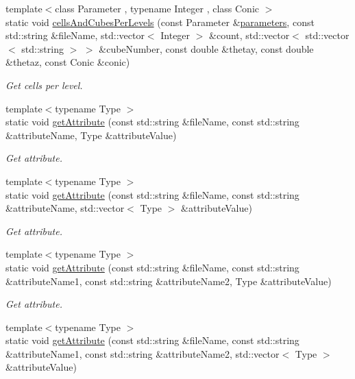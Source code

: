 \begin{DoxyCompactItemize}
{\footnotesize template$<$class Parameter , typename Integer , class Conic $>$ }\\static void \hyperlink{classTReadHDF5_ab142e0d47373804593362c6a92872785}{cells\-And\-Cubes\-Per\-Levels} (const Parameter \&\hyperlink{rays_8h_ae1bc8b0b8c8b9f8e4cc61a5cc7c4ce9e}{parameters}, const std\-::string \&file\-Name, std\-::vector$<$ Integer $>$ \&count, std\-::vector$<$ std\-::vector$<$ std\-::string $>$ $>$ \&cube\-Number, const double \&thetay, const double \&thetaz, const Conic \&conic)
\begin{DoxyCompactList}\small\item\em Get cells per level. \end{DoxyCompactList}\item 
{\footnotesize template$<$typename Type $>$ }\\static void \hyperlink{classTReadHDF5_a4c2d118dacf586206bb9cfa14016d361}{get\-Attribute} (const std\-::string \&file\-Name, const std\-::string \&attribute\-Name, Type \&attribute\-Value)
\begin{DoxyCompactList}\small\item\em Get attribute. \end{DoxyCompactList}\item 
{\footnotesize template$<$typename Type $>$ }\\static void \hyperlink{classTReadHDF5_a1cf2dbad8b9add78d95262d8fc638834}{get\-Attribute} (const std\-::string \&file\-Name, const std\-::string \&attribute\-Name, std\-::vector$<$ Type $>$ \&attribute\-Value)
\begin{DoxyCompactList}\small\item\em Get attribute. \end{DoxyCompactList}\item 
{\footnotesize template$<$typename Type $>$ }\\static void \hyperlink{classTReadHDF5_aca28e0bf060104fb784527da376c6f7b}{get\-Attribute} (const std\-::string \&file\-Name, const std\-::string \&attribute\-Name1, const std\-::string \&attribute\-Name2, Type \&attribute\-Value)
\begin{DoxyCompactList}\small\item\em Get attribute. \end{DoxyCompactList}\item 
{\footnotesize template$<$typename Type $>$ }\\static void \hyperlink{classTReadHDF5_a1e1af3932520e11e400e0d884e69a68c}{get\-Attribute} (const std\-::string \&file\-Name, const std\-::string \&attribute\-Name1, const std\-::string \&attribute\-Name2, std\-::vector$<$ Type $>$ \&attribute\-Value)

\end{DoxyCompactItemize}
